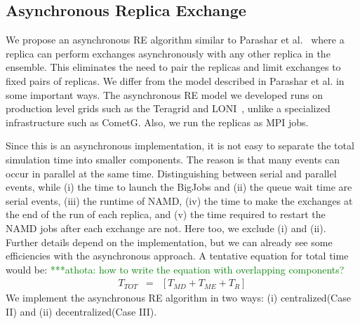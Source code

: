 \documentclass[a4paper,10pt]{article}
\newcommand{\athotanote}[1]{ {\textcolor{green} { ***athota: #1 }}}
\newcommand{\athotanote}[1]{}
\begin{document}
  
\subsection{Asynchronous Replica Exchange}

We propose an asynchronous RE algorithm similar to Parashar et al.~\cite{parashar_arepex}
where a replica can perform exchanges asynchronously with any other replica in the ensemble. This eliminates the need to pair the replicas and limit exchanges to fixed pairs of replicas. We differ from the model described in Parashar et al. in some important ways. The asynchronous RE model we developed runs on production level grids such as the Teragrid and LONI~\cite{LONI_web}, unlike a specialized infrastructure such as CometG. Also, we run the replicas as MPI jobs. 

Since this is an asynchronous implementation, it is not easy to separate the total simulation time into smaller components. The reason is that many events can occur in parallel at the same time. Distinguishing between serial and parallel events, while (i) the time to launch the BigJobs and (ii) the queue wait time are serial events, (iii) the runtime of NAMD, (iv) the time to make the exchanges at the end of the run of each replica, and (v) the time required to restart the NAMD jobs after each exchange are not. %
Here too, we exclude (i) and (ii). Further details depend on the implementation, but we can already see some efficiencies with the asynchronous approach. A tentative equation for total time would be:
\athotanote{how to write the equation with overlapping components?}
  \begin{eqnarray}
T_{TOT} &=& [T_{MD} + T_{ME} + T_{R}]
\label{eq:equation 1}
\end{eqnarray}
We implement the asynchronous RE algorithm in two ways: (i) centralized(Case II) and (ii) decentralized(Case III).
\end{document}
